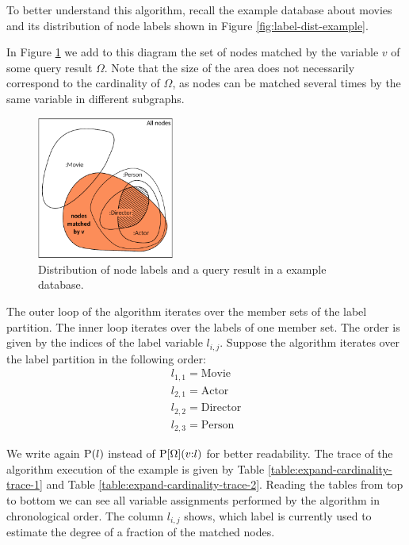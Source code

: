 To better understand this algorithm, recall the example database about movies
and its distribution of node labels shown in Figure
\ref{fig:label-dist-example}.

In Figure \ref{fig:label-dist-example-with-result} we add to this diagram the
set of nodes matched by the variable $v$ of some query result $\Omega$.
Note that the size of the area does not necessarily
correspond to the cardinality of $\Omega$, as nodes can be matched several
times by the same variable in different subgraphs.

\begin{figure}
  \centering
  \includegraphics[width=0.4\textwidth]{figures/nodes-venn-diagram-with-query-result.pdf}
  \caption{Distribution of node labels and a query result in a example
           database.}
  \label{fig:label-dist-example-with-result}
\end{figure}

The outer loop of the algorithm iterates over the member sets of the label
partition. The inner loop iterates over the labels of one member set.
The order is given by the indices of the label variable $l_{i,j}$.
Suppose the algorithm iterates over the label partition in the following
order:
\begin{align*}
  l_{1,1} = \text{Movie} \\
  l_{2,1} = \text{Actor} \\
  l_{2,2} = \text{Director} \\
  l_{2,3} = \text{Person}
\end{align*}

We write again $\operatorname{P}(l)$ instead of $\operatorname{P}[\Omega](v{:}l)$ for better
readability.
The trace of the algorithm execution of the example is given by Table
\ref{table:expand-cardinality-trace-1} and Table
\ref{table:expand-cardinality-trace-2}.
Reading the tables from top to bottom we can see all variable assignments
performed by the algorithm in chronological order.
The column $l_{i,j}$ shows, which label is currently used to estimate the
degree of a fraction of the matched nodes.

